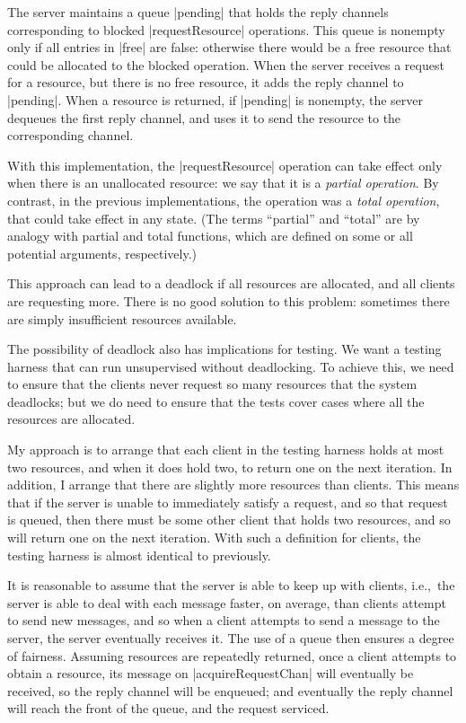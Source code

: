 The server maintains a queue |pending| that holds the reply channels
corresponding to blocked |requestResource| operations.  This queue is nonempty
only if all entries in |free| are false: otherwise there would be a free
resource that could be allocated to the blocked operation.  When the server
receives a request for a resource, but there is no free resource, it adds the
reply channel to |pending|.  When a resource is returned, if |pending| is
nonempty, the server dequeues the first reply channel, and uses it to send the
resource to the corresponding channel.

With this implementation, the |requestResource| operation can take effect only
when there is an unallocated resource: we say that it is a \emph{partial
  operation}.  By contrast, in the previous implementations, the operation was
a \emph{total operation}, that could take effect in any state.  (The terms
``partial'' and ``total'' are by analogy with partial and total functions,
which are defined on some or all potential arguments, respectively.)

This approach can lead to a deadlock if all resources are allocated, and all
clients are requesting more.  There is no good solution to this problem:
sometimes there are simply insufficient resources available.  

The possibility of deadlock also has implications for testing.  We want a
testing harness that can run unsupervised without deadlocking.  To achieve
this, we need to ensure that the clients never request so many resources that
the system deadlocks; but we do need to ensure that the tests cover cases
where all the resources are allocated.  

My approach is to arrange that each client in the testing harness holds at
most two resources, and when it does hold two, to return one on the next
iteration.  In addition, I arrange that there are slightly more resources than
clients.  This means that if the server is unable to immediately satisfy a
request, and so that request is queued, then there must be some other client
that holds two resources, and so will return one on the next iteration.  With
such a definition for clients, the testing harness is almost identical to
previously. 

It is reasonable to assume that the server is able to keep up with clients,
i.e.,~the server is able to deal with each message faster, on average, than
clients attempt to send new messages, and so when a client attempts to send a
message to the server, the server eventually receives it.  The use of a queue
then ensures a degree of fairness.  Assuming resources are repeatedly
returned, once a client attempts to obtain a resource, its message on
|acquireRequestChan| will eventually be received, so the reply channel will be
enqueued; and eventually the reply channel will reach the front of the queue,
and the request serviced.


